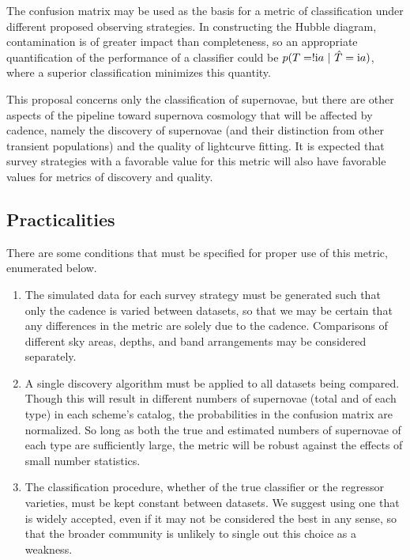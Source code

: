 \documentclass[12pt, onecolumn]{emulateapj}
\newcommand{\RN}[1]{%
	\textup{\uppercase\expandafter{\romannumeral#1}}%
}
\begin{document}
The confusion matrix may be used as the basis for a metric of classification under different proposed observing strategies.  In constructing the Hubble diagram, contamination is of greater impact than completeness, so an appropriate quantification of the performance of a classifier could be $p(T=!\RN{1}a\ |\ \hat{T}=\RN{1}a)$, where a superior classification minimizes this quantity.

This proposal concerns only the classification of supernovae, but there are other aspects of the pipeline toward supernova cosmology that will be affected by cadence, namely the discovery of supernovae (and their distinction from other transient populations) and the quality of lightcurve fitting.  It is expected that survey strategies with a favorable value for this metric will also have favorable values for metrics of discovery and quality.

\subsection{Practicalities}

There are some conditions that must be specified for proper use of this metric, enumerated below.

\begin{enumerate}
\item The simulated data for each survey strategy must be generated such that only the cadence is varied between datasets, so that we may be certain that any differences in the metric are solely due to the cadence.  Comparisons of different sky areas, depths, and band arrangements may be considered separately.
\item A single discovery algorithm must be applied to all datasets being compared.  Though this will result in different numbers of supernovae (total and of each type) in each scheme's catalog, the probabilities in the confusion matrix are normalized.  So long as both the true and estimated numbers of supernovae of each type are sufficiently large, the metric will be robust against the effects of small number statistics.
\item The classification procedure, whether of the true classifier or the regressor varieties, must be kept constant between datasets.  We suggest using one that is widely accepted, even if it may not be considered the best in any sense, so that the broader community is unlikely to single out this choice as a weakness.
\end{enumerate}



%
\end{document}
